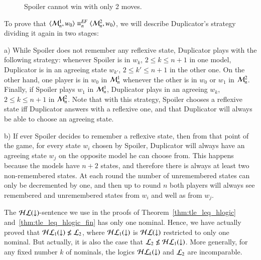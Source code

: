 \begin{pf}
\begin{figure}
\begin{center}
\end{center}
\caption{Spoiler cannot win with only 2 moves.}
\end{figure}

To prove that $\langle \mathcal{M}^1_n,w_0 \rangle\equiv^{\mathit{EF}}_n\langle \mathcal{M}^2_n,w_0 \rangle$, we
will describe Duplicator's strategy dividing it again in two stages:
\smallskip

\noindent a) While Spoiler does not remember any reflexive state,
Duplicator plays with the following strategy: whenever Spoiler is in
$w_k$, $2\leq k \leq n+1$ in one model, Duplicator is in an agreeing
state $w_{k'}$, $2\leq k' \leq n+1$ in the other one. On the other
hand, one player is in $w_0$ in $\mathcal{M}^1_n$ whenever the other is
in $w_0$ or $w_1$ in $\mathcal{M}^2_n$. Finally, if Spoiler plays $w_1$
in $\mathcal{M}^1_n$, Duplicator plays in an agreeing $w_k$, $2\leq k
\leq n+1$ in $\mathcal{M}^2_n$. Note that with this strategy, Spoiler
chooses a reflexive state iff Duplicator answers with a reflexive
one, and that Duplicator will always be able to choose an agreeing
state.

\noindent b) If ever Spoiler decides to remember a reflexive state,
then from that point of the game, for every state $w_i$ chosen by
Spoiler, Duplicator will always have an agreeing state $w_j$ on the
opposite model he can choose from. This happens because the models
have $n+2$ states, and therefore there is always at least two
non-remembered states. At each round the number of unremembered
states can only be decremented by one, and then up to round $n$ both
players will always see remembered and unremembered states from
$w_i$ and well as from $w_j$.
\end{pf}


The $\mathcal{HL}({\downarrow})$-sentence we use in the proofs of
Theorem~\ref{thm:tle_leq_hlogic} and~\ref{thm:tle_leq_hlogic_fin}
has only one nominal.
  Hence, we have actually proved that
$\mathcal{HL}_1({\downarrow})\not\le\mathcal{L}_2$, where $\mathcal{HL}_1({\downarrow})$ is $\mathcal{HL}({\downarrow})$
restricted to only one nominal.  But actually, it is also the case
that $\mathcal{L}_2 \not\le\mathcal{HL}_1({\downarrow})$.  More generally, for any fixed
number $k$ of nominals, the logics $\mathcal{HL}_k({\downarrow})$ and $\mathcal{L}_2$ are
incomparable.


